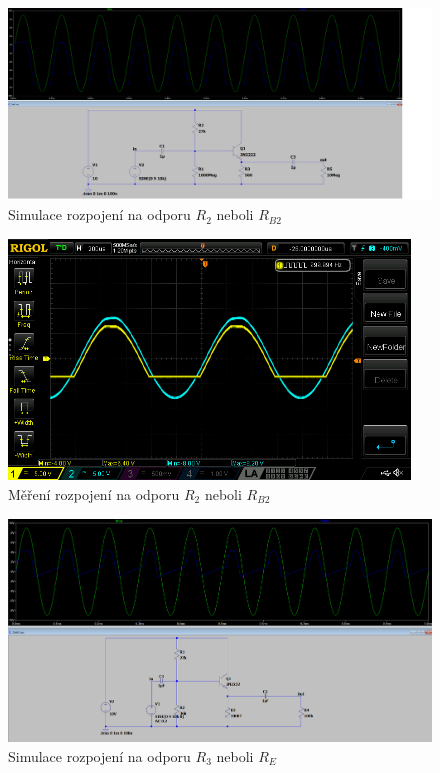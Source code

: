 \documentclass{article}
\begin{document}

\begin{figure}[H]
  \centering
  \includegraphics[width=\textwidth]{sim/ukol2/porucha1.png}
  \caption{Simulace rozpojení na odporu \(R_2\) neboli \(R_{B2}\)}
  \label{fig:sch-sc-p2}
\end{figure}

\begin{figure}[H]
  \centering
  \includegraphics[width=0.95\textwidth]{mereni/NewFolder1/NewFile9.png}
  \caption{Měření rozpojení na odporu \(R_2\) neboli \(R_{B2}\)}
  \label{fig:m-sch-sc-p2}
\end{figure}


\begin{figure}[H]
  \centering
  \includegraphics[width=\textwidth]{sim/ukol2/porucha2-seZatezi100k.png}
  \caption{Simulace rozpojení na odporu \(R_3\) neboli \(R_{E}\)}
  \label{fig:sch-sc-p3}
\end{figure}
\end{document}
